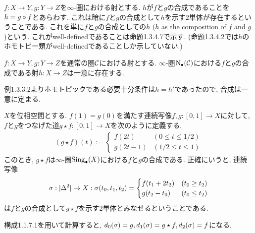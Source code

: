 \documentclass[uplatex, a4paper, 14Q, dvipdfmx]{jsreport}
\begin{document}
\begin{nota}
  $f:X \to Y, g: Y \to Z$を$\infty$-圏における射とする. 
  $h$が$f$と$g$の合成であることを$h=g \circ f$とあらわす. 
  これは暗に$f$と$g$の合成として$h$を示す$2$単体が存在するということである. 
  これを単に$f$と$g$の合成としての$h$ ($h$ as the composition of $f$ and $g$)という. 
  これがwell-definedであることは命題1.3.4.7で示す. 
  (命題1.3.4.2では$h$のホモトピー類がwell-definedであることしか示していない.)
\end{nota}

\begin{example}
  $f: X \to Y, g: Y \to Z$を通常の圏$\mathcal{C}$における射とする. 
  $\infty$-圏$\mathrm{N}_{\bullet}(\mathcal{C})$における$f$と$g$の合成である射$h: X \to Z$は一意に存在する. 
\end{example}

\begin{Proof}
  例1.3.3.2よりホモトピックである必要十分条件は$h=h'$であったので, 合成は一意に定まる. 
\end{Proof}

\begin{example}
  $X$を位相空間とする. 
  $f(1)=g(0)$を満たす連続写像$f,g: [0,1] \to X$に対して, $f$と$g$をつなげた道$g \star f: [0,1] \to X$を次のように定義する. 
  \begin{align*}
    (g \star f)(t) :=
    \begin{cases}
      f(2t) &(0 \leq t \leq 1/2) \\
      g(2t-1) &(1/2 \leq t \leq 1)
    \end{cases}
  \end{align*}
  このとき, $g \star f$は$\infty$-圏$\mathrm{Sing}_\bullet(X)$における$f$と$g$の合成である. 
  正確にいうと, 連続写像
  \begin{align*}
    \sigma: |\Delta^2| \to X :
    \sigma(t_0,t_1,t_2)=
    \begin{cases}
      f(t_1+2t_2) &(t_0 \geq t_2) \\
      g(t_2-t_0) &(t_0 \leq t_2)
    \end{cases}
  \end{align*}
  は$f$と$g$の合成として$g \star f$を示す$2$単体とみなせるということである. 
\end{example}

\begin{Proof}
  構成1.1.7.1を用いて計算すると, $d_0(\sigma)=g, d_1(\sigma)=g \star f, d_2(\sigma)=f$になる. 
  \begin{center}
  \end{center}
\end{Proof}
\end{document}
